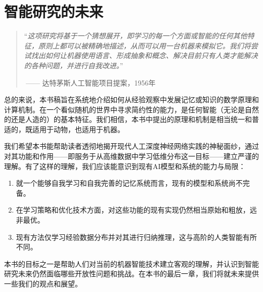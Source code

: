 \documentclass[../../book-main_zh.tex]{subfiles}
\begin{document}
\chapter{智能研究的未来}
\label{ch:future}


  

\begin{quote}
“{\em 这项研究将基于一个猜想展开，即学习的每一个方面或智能的任何其他特征，原则上都可以被精确地描述，从而可以用一台机器来模拟它。我们将尝试找出如何让机器使用语言、形成抽象和概念、解决目前只有人类才能解决的各种问题，并进行自我改进。}”

$~$\hfill —— 达特茅斯人工智能项目提案，1956年
 \end{quote}
\vspace{5mm}


总的来说，本书稿旨在系统地介绍如何从经验观察中发展记忆或知识的数学原理和计算机制。在一个看似随机的世界中寻求简约性的能力，是任何智能（无论是自然的还是人造的）的基本特征。我们相信，本书中提出的原理和机制是相当统一和普适的，既适用于动物，也适用于机器。

我们希望本书能帮助读者透彻地揭开现代人工深度神经网络实践的神秘面纱，通过对其功能和作用——即服务于从高维数据中学习低维分布这一目标——建立严谨的理解。有了这样的理解，我们应该能意识到现有AI模型和系统的能力与局限：
\begin{enumerate}
    \item 就一个能够自我学习和自我完善的记忆系统而言，现有的模型和系统尚不完备。
    \item 在学习策略和优化技术方面，对这些功能的现有实现仍然相当原始和粗放，远非最优。
    \item 现有方法仅学习经验数据分布并对其进行归纳推理，这与高阶的人类智能有所不同。
\end{enumerate} 

本书的目标之一是帮助人们对当前的机器智能技术建立客观的理解，并认识到智能研究未来仍然面临哪些开放性问题和挑战。在本书的最后一章，我们将就未来提供一些我们的观点和展望。
\end{document}
